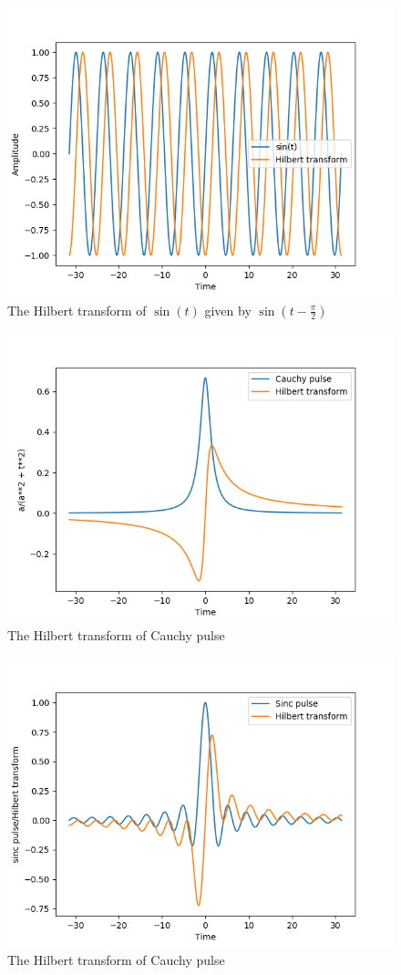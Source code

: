 \documentclass[../Main/thesis.tex]{subfiles}
\begin{document}
\begin{figure}[H]
	\centering
	\includegraphics[width=0.8\linewidth]{../fig/h_sin}
	\caption{The Hilbert transform of $\sin(t)$ given by $\sin(t-\frac{\pi}{2})$  }
	\label{fig:startimf1bpfi}
\end{figure}

\begin{figure}[H]
	\centering
	\includegraphics[width=0.8\linewidth]{../fig/cauchy_pulse}
	\caption{The Hilbert transform of Cauchy pulse }
	\label{fig:startimf1bpfi}
\end{figure}

\begin{figure}[H]
	\centering
	\includegraphics[width=0.8\linewidth]{../fig/sinc_pulse}
	\caption{The Hilbert transform of Cauchy pulse }
	\label{fig:startimf1bpfi}
\end{figure}
\end{document}
